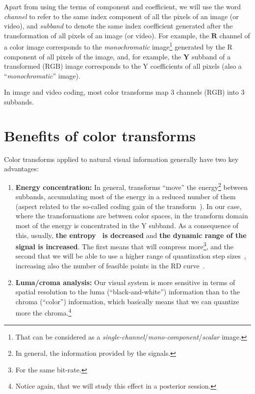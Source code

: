 Apart from using the terms of component and coefficient, we will use
the word \emph{channel} to refer to the same index component of all
the pixels of an image (or video), and \emph{subband} to denote the
same index coefficient generated after the transformation of all
pixels of an image (or video). For example, the $\mathbf{R}$ channel of
a color image corresponds to the \emph{monochromatic}
image\footnote{That can be considered as a
  \emph{single-channel}/\emph{mono-component}/\emph{scalar} image.}
generated by the $\text{R}$ component of all pixels of the image,
and, for example, the $\mathbf{Y}$ subband of a transformed
($\text{RGB}$) image corresponds to the $\text{Y}$ coefficients of all pixels (also a ``\emph{monochromatic}'' image).

In image and video coding, most color transforms map 3 channels
($\text{RGB}$) into 3 subbands.

\section{Benefits of color transforms}

Color transforms applied to natural visual information generally have
two key advantages:
\begin{enumerate}
\item \textbf{Energy concentration:} In general, transforms ``move''
  the energy\footnote{In general, the information provided by the
    signals.} between subbands, accumulating most of the energy in a
  reduced number of them (aspect related to the so-called coding gain
  of the transform~\cite{vruiz__transform_coding}). In our case, where
  the transformations are between color spaces, in the transform
  domain most of the energy is concentrated in the $\text{Y}$
  subband. As a consequence of this, usually, \textbf{the
    entropy~\cite{vruiz__information_theory} is decreased} and
  \textbf{the dynamic range of the signal is increased}. The first
  means that will compress more\footnote{For the same bit-rate.}, and
  the second that we will be able to use a higher range of
  quantization step
  sizes~\cite{vruiz__scalar_quantization,sayood2017introduction},
  increasing also the number of feasible points in the RD
  curve~\cite{vruiz__information_theory}.
\item \textbf{Luma/croma analysis:} Our visual system is more
  sensitive in terms of spatial resolution to the luma
  (``black-and-white'') information than to the chroma (``color'')
  information, which basically means that we can quantize more the
  chroma.\footnote{Notice again, that we will study this effect in a
  posterior session.}
\end{enumerate}


